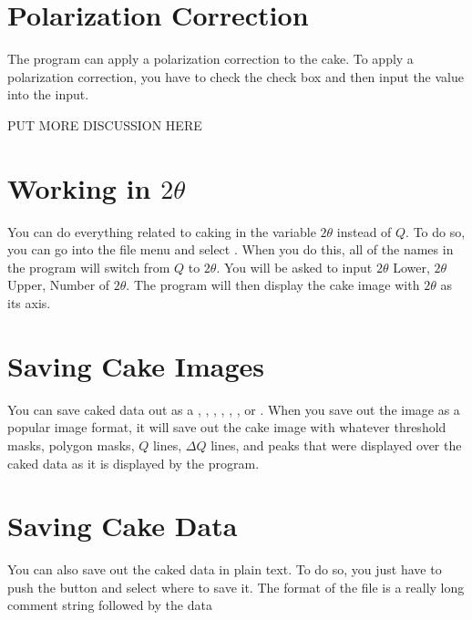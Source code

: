 \section{Polarization Correction}
The program can apply a polarization correction to the
cake. To apply a polarization correction, you have
to check the  check box
and then input the value into the  input.

PUT MORE DISCUSSION HERE

\section{\texorpdfstring{Working in $2\theta$}{Working in 2theta}}

You can do everything related to caking in the variable
$2\theta$ instead of $Q$. To do so, you can go into
the file menu and select . When you 
do this, all of the names in the program will switch 
from $Q$ to $2\theta$. You will be asked to input 
$2\theta$ Lower, $2\theta$ Upper, Number of $2\theta$. 
The program will then display the cake image with
$2\theta$ as its axis.

\section{Saving Cake Images}

You can save caked
data out as a , , , , 
, , or .
When you save out the image as a popular image format, it
will save out the cake image with whatever threshold masks,
polygon masks, $Q$ lines, $\Delta Q$ lines, and peaks that
were displayed over the caked data as it is displayed by
the program.

\section{Saving Cake Data}

You can also save out the caked data in plain text. To do so,
you just have to push the  button and
select where to save it. The format of the file is a really
long comment string followed by the data 

